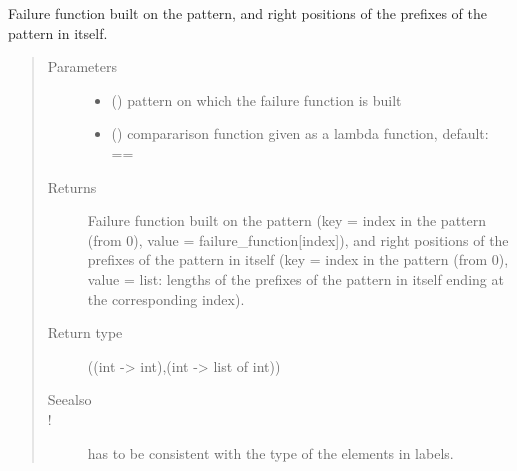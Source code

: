 \documentclass[letterpaper,10pt,english]{sphinxmanual}
\begin{document}

\begin{fulllineitems}
\label{\detokenize{index:PrefixIndexing.failure_function_and_right_pos_prefixes}}
Failure function built on the pattern, and right positions of the prefixes of the pattern in itself.
\begin{quote}\begin{description}
\item[{Parameters}] \leavevmode\begin{itemize}
\item {} 
 () \textendash{} pattern on which the failure function is built

\item {} 
 () \textendash{} compararison function given as a lambda function, default: ==

\end{itemize}

\item[{Returns}] \leavevmode
Failure function built on the pattern (key = index in the pattern (from 0), value = failure\_function{[}index{]}), and right positions of the prefixes of the pattern in itself (key = index in the pattern (from 0), value = list: lengths of the prefixes of the pattern in itself ending at the corresponding index).

\item[{Return type}] \leavevmode
{} ((int -\textgreater{} int),(int -\textgreater{} list of int))

\item[{Seealso}] \leavevmode
{} 

\item[{!}] \leavevmode
{} has to be consistent with the type of the elements in labels.


\end{description}
\end{quote}
\end{fulllineitems}
\end{document}
